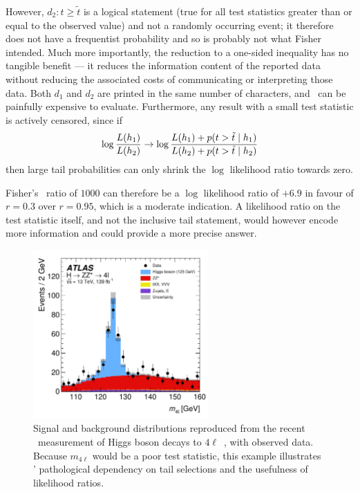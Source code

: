 However, $d_2: t \geq \tilde{t}$ is a logical statement (true for all test
statistics greater than or equal to the observed value) and not a randomly
occurring event; it therefore does not have a frequentist probability and so
is probably not what Fisher intended.
Much more importantly, the reduction to a one-sided inequality has no tangible
benefit --- it reduces the information content of the reported data without
reducing the associated costs of communicating or interpreting those data.
Both $d_1$ and $d_2$ are printed in the same number of characters, and
\pvalues\ can be painfully expensive to evaluate.
Furthermore, any result with a small test statistic is actively censored,
since if
\begin{equation}
\log \frac{L(h_1)}{L(h_2)}
\to
\log \frac{
L(h_1) + p(t > \tilde{t} \mid h_1)
}
{
L(h_2) + p(t > \tilde{t} \mid h_2)
}
\end{equation}
then large tail probabilities can only shrink the $\log$ likelihood ratio
towards zero.

Fisher's \pvalue\ ratio of $1000$ can therefore be a $\log$ likelihood
ratio of $+6.9$ in favour of $r=0.3$ over $r=0.95$, which is a moderate
indication.
A likelihood ratio on the test statistic itself, and not the inclusive
tail statement, would however encode more information and could provide a
more precise answer.

\begin{figure}[tp]
\centering
\includegraphics[width=0.6\textwidth]{figures/searches_atlas_higgs_4l_2207_00320.pdf}
\caption[
Signal and background distributions reproduced from the recent \atlas\
measurement of Higgs boson decays to $4\ell$
]{%
Signal and background distributions reproduced from the recent \atlas\
measurement of Higgs boson decays to $4\ell$~\cite{ATLAS:2022net}, with
observed data.
Because $m_{4\ell}$ would be a poor test statistic, this example illustrates
\pvalues' pathological dependency on tail selections and the usefulness of
likelihood ratios.
}
\label{fig:searches_atlas_higgs_4l}
\end{figure}

